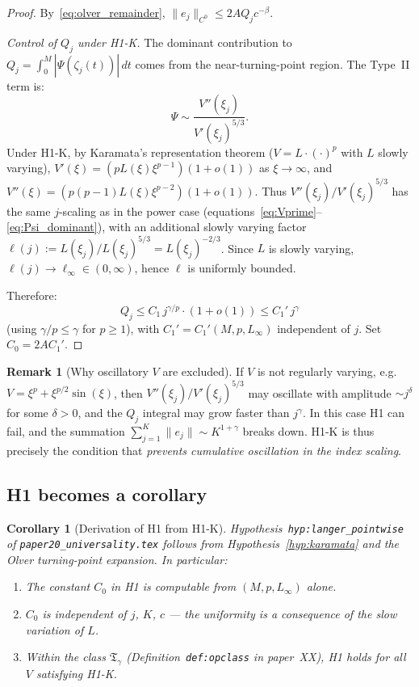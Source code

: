 \documentclass[12pt,a4paper]{amsart}
\newtheorem{corollary}[theorem]{Corollary}
\theoremstyle{definition}
\newtheorem{remark}[theorem]{Remark}
\begin{document}
\begin{proof}
By~\eqref{eq:olver_remainder}, $\|e_j\|_{C^0}\leq 2AQ_j c^{-\beta}$.

\textit{Control of $Q_j$ under H1-K.}
The dominant contribution to $Q_j = \int_0^M|\Psi(\zeta_j(t))|\,dt$
comes from the near-turning-point region.
The Type~II term is:
\[
  \Psi \sim \frac{V''(\xi_j)}{V'(\xi_j)^{5/3}}.
\]
Under H1-K, by Karamata's representation theorem
($V = L\cdot (\cdot)^p$ with $L$ slowly varying),
$V'(\xi) = (pL(\xi)\xi^{p-1})(1+o(1))$ as $\xi\to\infty$,
and $V''(\xi) = (p(p-1)L(\xi)\xi^{p-2})(1+o(1))$.
Thus $V''(\xi_j)/V'(\xi_j)^{5/3}$ has the same $j$-scaling
as in the power case (equations~\eqref{eq:Vprime}--\eqref{eq:Psi_dominant}),
with an additional slowly varying factor
$\ell(j) := L(\xi_j)/L(\xi_j)^{5/3} = L(\xi_j)^{-2/3}$.
Since $L$ is slowly varying,
$\ell(j)\to \ell_\infty \in (0,\infty)$,
hence $\ell$ is uniformly bounded.

Therefore:
\[
  Q_j \leq C_1\,j^{\gamma/p}\cdot (1+o(1))
  \leq C_1'\,j^\gamma
\]
(using $\gamma/p\leq\gamma$ for $p\geq 1$),
with $C_1' = C_1'(M,p,L_\infty)$ independent of $j$.
Set $C_0 = 2AC_1'$.
\end{proof}

\begin{remark}[Why oscillatory $V$ are excluded]
\label{rem:oscillatory}
If $V$ is not regularly varying, e.g.
$V = \xi^p + \xi^{p/2}\sin(\xi)$,
then $V''(\xi_j)/V'(\xi_j)^{5/3}$ may oscillate
with amplitude $\sim j^\delta$ for some $\delta>0$,
and the $Q_j$ integral may grow faster than $j^\gamma$.
In this case H1 can fail, and the summation
$\sum_{j=1}^K \|e_j\| \sim K^{1+\gamma}$ breaks down.
H1-K is thus precisely the condition that
\emph{prevents cumulative oscillation in the index scaling}.
\end{remark}

\subsection{H1 becomes a corollary}

\begin{corollary}[Derivation of H1 from H1-K]
\label{cor:h1_derived}
Hypothesis~\texttt{hyp:langer\_pointwise} of
\texttt{paper20\_universality.tex}
follows from Hypothesis~\ref{hyp:karamata}
and the Olver turning-point expansion.
In particular:
\begin{enumerate}[label=(\roman*),nosep]
  \item The constant $C_0$ in H1 is computable
    from $(M,p,L_\infty)$ alone.
  \item $C_0$ is independent of $j$, $K$, $c$
    --- the uniformity is a consequence of the slow variation of $L$.
  \item Within the class $\mathfrak{T}_\gamma$
    (Definition~\texttt{def:opclass} in paper~XX),
    H1 holds for all $V$ satisfying H1-K.
\end{enumerate}
\end{corollary}
\end{document}
